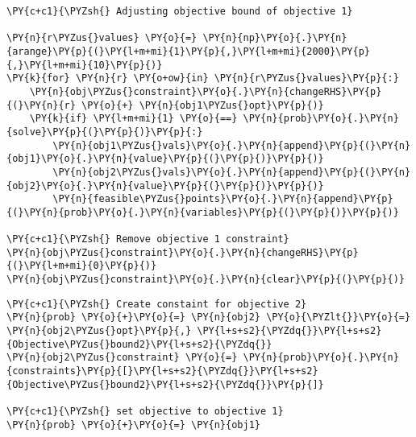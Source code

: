    \begin{tcolorbox}[breakable, size=fbox, boxrule=1pt, pad at break*=1mm,colback=cellbackground, colframe=cellborder]
\begin{Verbatim}[commandchars=\\\{\}]
\PY{c+c1}{\PYZsh{} Adjusting objective bound of objective 1}

\PY{n}{r\PYZus{}values} \PY{o}{=} \PY{n}{np}\PY{o}{.}\PY{n}{arange}\PY{p}{(}\PY{l+m+mi}{1}\PY{p}{,}\PY{l+m+mi}{2000}\PY{p}{,}\PY{l+m+mi}{10}\PY{p}{)}
\PY{k}{for} \PY{n}{r} \PY{o+ow}{in} \PY{n}{r\PYZus{}values}\PY{p}{:}
    \PY{n}{obj\PYZus{}constraint}\PY{o}{.}\PY{n}{changeRHS}\PY{p}{(}\PY{n}{r} \PY{o}{+} \PY{n}{obj1\PYZus{}opt}\PY{p}{)}
    \PY{k}{if} \PY{l+m+mi}{1} \PY{o}{==} \PY{n}{prob}\PY{o}{.}\PY{n}{solve}\PY{p}{(}\PY{p}{)}\PY{p}{:}
        \PY{n}{obj1\PYZus{}vals}\PY{o}{.}\PY{n}{append}\PY{p}{(}\PY{n}{obj1}\PY{o}{.}\PY{n}{value}\PY{p}{(}\PY{p}{)}\PY{p}{)}
        \PY{n}{obj2\PYZus{}vals}\PY{o}{.}\PY{n}{append}\PY{p}{(}\PY{n}{obj2}\PY{o}{.}\PY{n}{value}\PY{p}{(}\PY{p}{)}\PY{p}{)}
        \PY{n}{feasible\PYZus{}points}\PY{o}{.}\PY{n}{append}\PY{p}{(}\PY{n}{prob}\PY{o}{.}\PY{n}{variables}\PY{p}{(}\PY{p}{)}\PY{p}{)}

\PY{c+c1}{\PYZsh{} Remove objective 1 constraint}
\PY{n}{obj\PYZus{}constraint}\PY{o}{.}\PY{n}{changeRHS}\PY{p}{(}\PY{l+m+mi}{0}\PY{p}{)}
\PY{n}{obj\PYZus{}constraint}\PY{o}{.}\PY{n}{clear}\PY{p}{(}\PY{p}{)}
\end{Verbatim}
\end{tcolorbox}

    \begin{tcolorbox}[breakable, size=fbox, boxrule=1pt, pad at break*=1mm,colback=cellbackground, colframe=cellborder]
\begin{Verbatim}[commandchars=\\\{\}]
\PY{c+c1}{\PYZsh{} Create constaint for objective 2}
\PY{n}{prob} \PY{o}{+}\PY{o}{=} \PY{n}{obj2} \PY{o}{\PYZlt{}}\PY{o}{=} \PY{n}{obj2\PYZus{}opt}\PY{p}{,} \PY{l+s+s2}{\PYZdq{}}\PY{l+s+s2}{Objective\PYZus{}bound2}\PY{l+s+s2}{\PYZdq{}}
\PY{n}{obj2\PYZus{}constraint} \PY{o}{=} \PY{n}{prob}\PY{o}{.}\PY{n}{constraints}\PY{p}{[}\PY{l+s+s2}{\PYZdq{}}\PY{l+s+s2}{Objective\PYZus{}bound2}\PY{l+s+s2}{\PYZdq{}}\PY{p}{]}

\PY{c+c1}{\PYZsh{} set objective to objective 1}
\PY{n}{prob} \PY{o}{+}\PY{o}{=} \PY{n}{obj1}
\end{Verbatim}
\end{tcolorbox}

